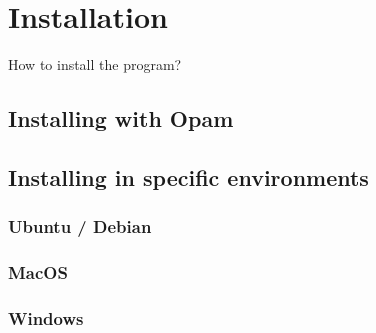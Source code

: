 \chapter{Installation}
How to install the program?

\section{Installing with Opam}

\section{Installing in specific environments}
\subsection{Ubuntu / Debian}

\subsection{MacOS}

\subsection{Windows}
